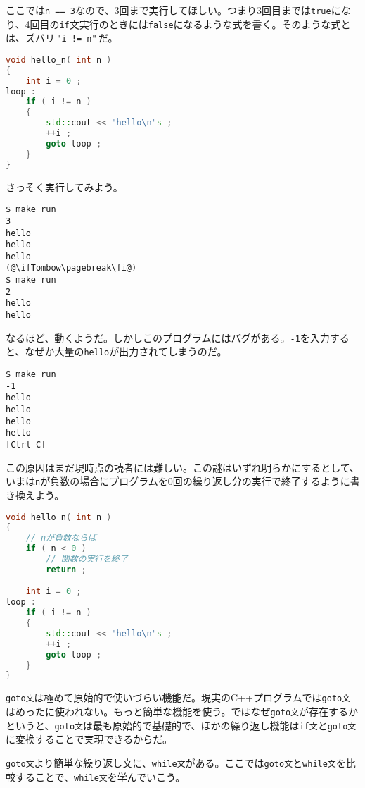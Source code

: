 ここでは\texttt{n == 3}なので、3回まで実行してほしい。つまり3回目までは\texttt{true}になり、4回目の\texttt{if}文実行のときには\texttt{false}になるような式を書く。そのような式とは、ズバリ\,\texttt{"i != n"}\,だ。

\begin{lstlisting}[language={C++}]
void hello_n( int n )
{
    int i = 0 ;
loop :
    if ( i != n )
    {
        std::cout << "hello\n"s ;
        ++i ;
        goto loop ;
    }
}
\end{lstlisting}

さっそく実行してみよう。

\begin{lstlisting}[style=terminal]
$ make run
3
hello
hello
hello
(@\ifTombow\pagebreak\fi@)
$ make run
2
hello
hello
\end{lstlisting}

なるほど、動くようだ。しかしこのプログラムにはバグがある。\texttt{-1}を入力すると、なぜか大量の\texttt{hello}が出力されてしまうのだ。

\begin{lstlisting}[style=terminal]
$ make run
-1
hello
hello
hello
hello
[Ctrl-C]
\end{lstlisting}

この原因はまだ現時点の読者には難しい。この謎はいずれ明らかにするとして、いまは\texttt{n}が負数の場合にプログラムを0回の繰り返し分の実行で終了するように書き換えよう。

\begin{lstlisting}[language={C++}]
void hello_n( int n )
{
    // nが負数ならば
    if ( n < 0 )
        // 関数の実行を終了
        return ;

    int i = 0 ;
loop :
    if ( i != n )
    {
        std::cout << "hello\n"s ;
        ++i ;
        goto loop ;
    }
}
\end{lstlisting}

\ifTombow\pagebreak\fi
{}

\texttt{goto文}は極めて原始的で使いづらい機能だ。現実のC++プログラムでは\texttt{goto文}はめったに使われない。もっと簡単な機能を使う。ではなぜ\texttt{goto文}が存在するかというと、\texttt{goto文}は最も原始的で基礎的で、ほかの繰り返し機能は\texttt{if文}と\texttt{goto文}に変換することで実現できるからだ。

\texttt{goto文}より簡単な繰り返し文に、\texttt{while文}がある。ここでは\texttt{goto文}と\texttt{while文}を比較することで、\texttt{while文}を学んでいこう。

